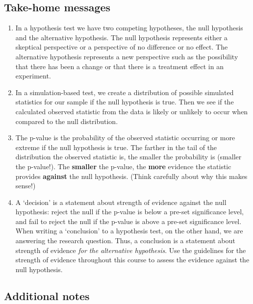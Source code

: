 \documentclass[
]{report}
\begin{document}
\vspace{0.5in}

\newpage

\hypertarget{take-home-messages-5}{%
\subsection{Take-home messages}\label{take-home-messages-5}}

\begin{enumerate}
\def\labelenumi{\arabic{enumi}.}
\item
  In a hypothesis test we have two competing hypotheses, the null hypothesis and the alternative hypothesis. The null hypothesis represents either a skeptical perspective or a perspective of no difference or no effect. The alternative hypothesis represents a new perspective such as the possibility that there has been a change or that there is a treatment effect in an experiment.
\item
  In a simulation-based test, we create a distribution of possible simulated statistics for our sample if the null hypothesis is true. Then we see if the calculated observed statistic from the data is likely or unlikely to occur when compared to the null distribution.
\item
  The p-value is the probability of the observed statistic occurring or more extreme if the null hypothesis is true. The farther in the tail of the distribution the observed statistic is, the smaller the probability is (smaller the p-value!). The \textbf{smaller} the p-value, the \textbf{more} evidence the statistic provides \textbf{against} the null hypothesis. (Think carefully about why this makes sense!)
\item
  A `decision' is a statement about strength of evidence against the null hypothesis: reject the null if the p-value is below a pre-set significance level, and fail to reject the null if the p-value is above a pre-set significance level. When writing a `conclusion' to a hypothesis test, on the other hand, we are answering the research question. Thus, a conclusion is a statement about strength of evidence \emph{for the alternative hypothesis}. Use the guidelines for the strength of evidence throughout this course to assess the evidence against the null hypothesis.
\end{enumerate}

\hypertarget{additional-notes-5}{%
\subsection{Additional notes}\label{additional-notes-5}}
\end{document}
